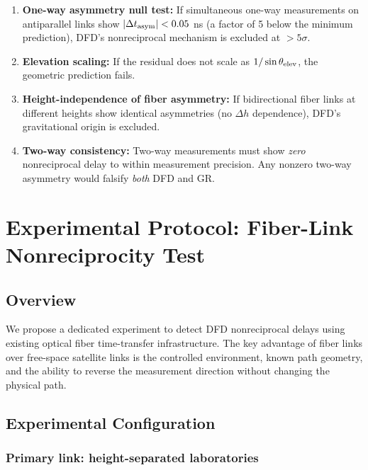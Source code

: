 \documentclass[12pt,a4paper,twocolumn]{article}
\begin{document}
\begin{enumerate}
\item \textbf{One-way asymmetry null test:} If simultaneous
one-way measurements on antiparallel links show
$|\Delta t_{\rm asym}| < 0.05$ ns (a factor of 5 below the
minimum prediction), DFD's nonreciprocal mechanism is excluded
at $>5\sigma$.

\item \textbf{Elevation scaling:} If the residual does not scale
as $1/\sin\theta_{\rm elev}$, the geometric prediction fails.

\item \textbf{Height-independence of fiber asymmetry:} If
bidirectional fiber links at different heights show identical
asymmetries (no $\Delta h$ dependence), DFD's gravitational
origin is excluded.

\item \textbf{Two-way consistency:} Two-way measurements must
show \emph{zero} nonreciprocal delay to within measurement
precision.  Any nonzero two-way asymmetry would falsify
\emph{both} DFD and GR.
\end{enumerate}

\section{Experimental Protocol: Fiber-Link Nonreciprocity Test}
\label{sec:experiment}

\subsection{Overview}

We propose a dedicated experiment to detect DFD nonreciprocal
delays using existing optical fiber time-transfer infrastructure.
The key advantage of fiber links over free-space satellite links
is the controlled environment, known path geometry, and the
ability to reverse the measurement direction without changing
the physical path.

\subsection{Experimental Configuration}

\subsubsection{Primary link: height-separated laboratories}
\end{document}
